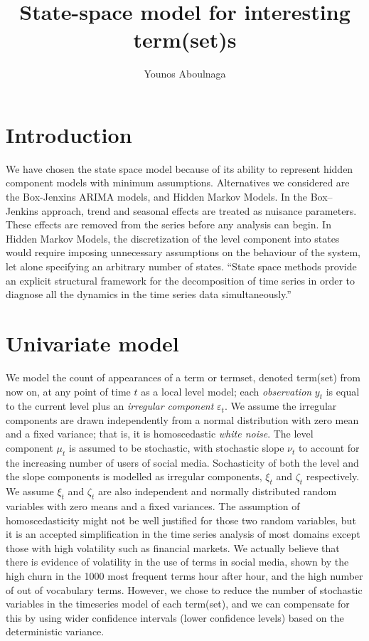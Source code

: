 \documentclass[11pt]{llncs} %
\title{State-space model for interesting term(set)s}
\author{Younos Aboulnaga\inst{1}}
\institute{David R. Cheriton School of Computer Science, University of Waterloo, Waterloo, ON, Canada \email{yaboulna@uwaterloo.ca}}
\begin{document}
\maketitle
\section{Introduction}
We have chosen the state space model because of its ability to represent hidden component models with minimum assumptions. Alternatives we considered are the Box-Jenxins ARIMA models, and Hidden Markov Models. In the Box–Jenkins approach, trend and seasonal effects are treated as nuisance parameters. These effects are removed from the series before any analysis can begin. In Hidden Markov Models, the discretization of the level component into states would require imposing unnecessary assumptions on the behaviour of the system, let alone specifying an arbitrary number of states. ``State space methods provide an explicit structural framework for the decomposition of time series in order to diagnose all the dynamics in the time series data simultaneously.'' \cite{Commandeur2007}

\section{Univariate model}
\label{sec:univariate-model}
We model the count of appearances of a term or termset, denoted term(set) from now on, at any point of time $t$ as a local level model; each \emph{observation} $y_t$ is equal to the current level plus an \emph{irregular component} $\varepsilon_t$. We assume the irregular components are drawn independently from a normal distribution with zero mean and a fixed variance; that is, it is homoscedastic \emph{white noise}. The level component $\mu_t$ is assumed to be stochastic, with stochastic slope $\nu_t$ to account for the increasing number of users of social media. Sochasticity of both the level and the slope components is modelled as irregular components, $\xi_t$ and $\zeta_t$ respectively. We assume  $\xi_t$ and $\zeta_t$ are also independent and normally distributed random variables with zero means and a fixed variances. The assumption of homoscedasticity might not be well justified for those two random variables, but it is an accepted simplification in the time series analysis of most domains except those with high volatility such as financial markets. We actually believe that there is evidence of volatility in the use of terms in social media, shown by the high churn in the 1000 most frequent terms hour after hour, and the high number of out of vocabulary terms. However, we chose to reduce the number of stochastic variables in the timeseries model of each term(set), and we can compensate for this by using wider confidence intervals (lower confidence levels) based on the deterministic variance.
\end{document}
